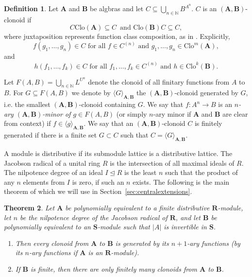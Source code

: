 \documentclass[12pt]{amsart}
\numberwithin{equation}{section}
\theoremstyle{plain}
\newtheorem{theorem}{Theorem}[section]
\theoremstyle{definition}
\newtheorem{definition}[theorem]{Definition}
\newcommand{\A}{\mathbf{A}}
\newcommand{\B}{\mathbf{B}}
\newcommand{\N}{\mathbb{N}}
\newcommand{\R}{\mathbf{R}}
\renewcommand{\S}{\mathbf{S}}
\newcommand{\Clo}{\mathrm{Clo}}
\begin{document}
\begin{definition}
  Let $\A$ and $\B$ be algbras and let $C \subseteq \bigcup_{n \in \N} B^{A^n}$.
  $C$ is an $(\A,\B)$-clonoid if 
    \[C \Clo(\A) \subseteq C \, \text{ and } \Clo(\B)C \subseteq C, \]
    where juxtaposition represents function class composition, as in \cite{Pi:GTMF}.
  Explicitly, 
    \[ f(g_1,\dots , g_n) \in C \text{ for all } f \in C^{(n)} \text{ and } g_1, \dots, g_n \in \Clo^{m}(\A), \]
    and 
    \[ h(f_1, \dots, f_k) \in C \text{ for all } f_1, \dots, f_k \in C^{(n)} \text{ and } h \in \Clo^k(\B). \]
\end{definition}

Let $F(A,B) = \bigcup_{n \in \N} L^{U^n}$ denote the clonoid of all finitary functions from $A$ to $B$. 
For $G \subseteq F(A,B)$ we denote by 
  $\langle G \rangle_{\A,\B}$ the $(\A,\B)$-clonoid generated by $G$,
  i.e. the smallest $(\A,\B)$-clonoid containing $G$.
We say that $f \colon A^n \rightarrow B$ is an \emph{$n$-ary $(\A,\B)$-minor of $g \in F(A,B)$} 
  (or simply $n$-ary minor if $\A$ and $\B$ are clear from context) 
  if $f \in \langle g \rangle_{\A,\B}$.
We say that an $(\A,\B)$-clonoid $C$ is finitely generated if there is a finite set 
  $G \subset C$ such that $C = \langle G \rangle_{\A,\B}$. 

A module is distributive if its submodule lattice is a distributive lattice.
The Jacobson radical of a unital ring $R$ is the intersection of all maximal ideals of $R$.
The nilpotence degree of an ideal $I \trianglelefteq R$ is the least $n$ 
  such that the product of any $n$ elements from $I$ is zero, if such an $n$ exists.
The following is the main theorem of \cite{MaWy:CBM} 
  which we will use in Section~\ref{sec:centralextensions}.


\begin{theorem} \label{thm:distributive} \cite[Theorem 1.4]{MaWy:CBM}
  Let $\A$ be polynomially equivalent to a finite distributive $\R$-module, let $n$ be the nilpotence degree of the
    Jacobson radical of $\R$, and let $\B$ be polynomially equivalent to an $\S$-module such that $|A|$ is
    invertible in $\S$.
  \begin{enumerate}
    \item 
      Then every clonoid from $\A$ to $\B$ is generated by its $n+1$-ary functions 
        (by its $n$-ary functions if $\A$ is an $\R$-module).
    \item 
      If $\B$ is finite, then there are only finitely many clonoids from $\A$ to $\B$. 
\end{enumerate}
\end{theorem}
\end{document}
